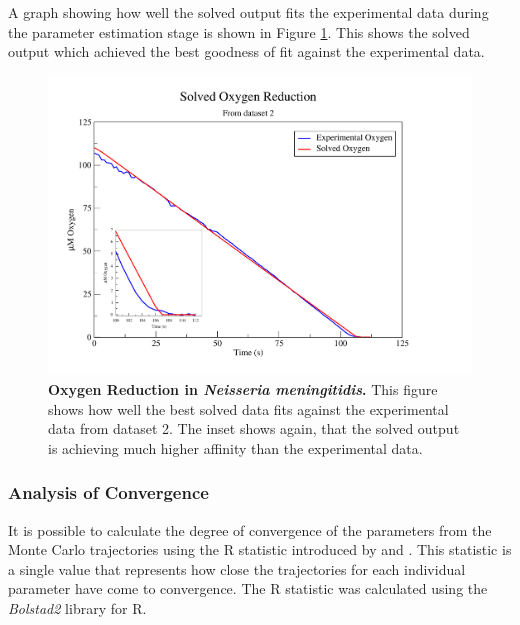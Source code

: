 A graph showing how well the solved output fits the experimental data during the parameter estimation stage is shown in Figure \ref{fig:oxyfinalsolved}. This shows the solved output which achieved the best goodness of fit against the experimental data.
\begin{figure}[tbp]
 \centering
 \includegraphics[width=14cm, trim=2cm 1cm 4cm 1cm]{./05-oxygenreduction/data/final_solved.pdf}
 \caption[{Oxygen Reduction in \textit{Neisseria meningitidis}.}]{{\bf Oxygen Reduction in \textit{Neisseria meningitidis}.} This figure shows how well the best solved data fits against the experimental data from dataset 2. The inset shows again, that the solved output is achieving much higher affinity than the experimental data.
 \label{fig:oxyfinalsolved}}
\end{figure}
\afterpage{\clearpage}

\subsubsection{Analysis of Convergence}
It is possible to calculate the degree of convergence of the parameters from the Monte Carlo trajectories using the R statistic introduced by \citet{Gelman1992} and \citet{Brooks1998}. This statistic is a single value that represents how close the trajectories for each individual parameter have come to convergence. The R statistic was calculated using the \textit{Bolstad2}\cite{Curran2011} library for R\cite{RDevelopmentCoreTeam2010}.

